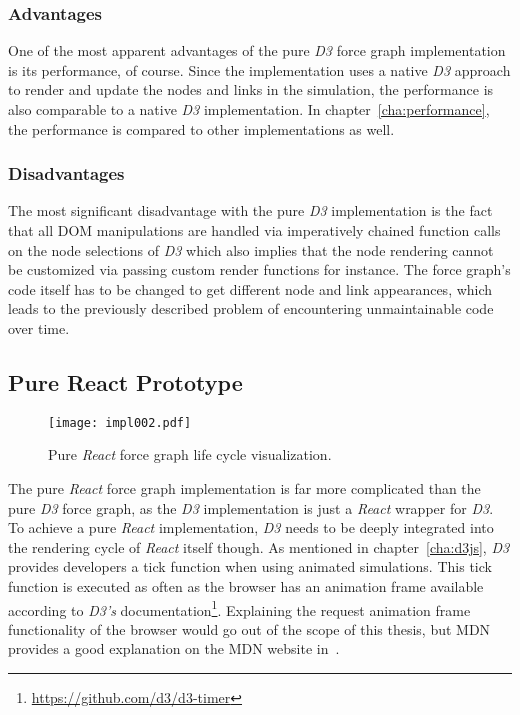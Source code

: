 \subsubsection{Advantages}

One of the most apparent advantages of the pure \emph{D3} force graph implementation is its performance, of course. Since the implementation uses a native \emph{D3} approach to render and update the nodes and links in the simulation, the performance is also comparable to a native \emph{D3} implementation. In chapter~\ref{cha:performance}, the performance is compared to other implementations as well.

\subsubsection{Disadvantages}

The most significant disadvantage with the pure \emph{D3} implementation is the fact that all DOM manipulations are handled via imperatively chained function calls on the node selections of \emph{D3} which also implies that the node rendering cannot be customized via passing custom render functions for instance. The force graph's code itself has to be changed to get different node and link appearances, which leads to the previously described problem of encountering unmaintainable code over time.


\subsection{Pure React Prototype}
\label{sec:pureReactPrototype}

\begin{figure}
\centering
\texttt{[image: impl002.pdf]}
\caption{Pure \emph{React} force graph life cycle visualization.}
\label{fig:pureReactLifecycle}
\end{figure}

The pure \emph{React} force graph implementation is far more complicated than the pure \emph{D3} force graph, as the \emph{D3} implementation is just a \emph{React} wrapper for \emph{D3}. To achieve a pure \emph{React} implementation, \emph{D3} needs to be deeply integrated into the rendering cycle of \emph{React} itself though. As mentioned in chapter~\ref{cha:d3js}, \emph{D3} provides developers a tick function when using animated simulations. This tick function is executed as often as the browser has an animation frame available according to \emph{D3's} documentation\footnote{\url{https://github.com/d3/d3-timer}}. Explaining the request animation frame functionality of the browser would go out of the scope of this thesis, but MDN provides a good explanation on the MDN website in~\cite{RAF}.

